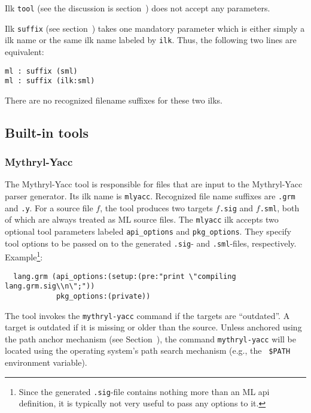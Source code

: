 Ilk {\tt tool} (see the discussion is section~)
does not accept any parameters.

Ilk {\tt suffix} (see section~) takes one
mandatory parameter which is either simply a ilk name or the same
ilk name labeled by {\tt ilk}.  Thus, the following two lines are
equivalent:

\begin{verbatim}
ml : suffix (sml)
ml : suffix (ilk:sml)
\end{verbatim}

There are no recognized filename suffixes for these two ilks.

\subsection{Built-in tools}
\label{sec:builtin-tools}

\subsubsection{Mythryl-Yacc}

The Mythryl-Yacc tool is responsible for files that are input to the
Mythryl-Yacc parser generator.  Its ilk name is {\tt mlyacc}.  Recognized
file name suffixes are {\tt .grm} and {\tt .y}.  For a source file
$f$, the tool produces two targets $f${\tt .sig} and $f${\tt .sml},
both of which are always treated as ML source files.  The {\tt mlyacc}
ilk accepts two optional tool parameters labeled {\tt api_options}
and {\tt pkg_options}.  They specify tool options to be passed on to
the generated {\tt .sig}- and {\tt .sml}-files, respectively.
Example\footnote{Since the generated {\tt .sig}-file contains nothing
more than an ML api definition, it is typically not very useful
to pass any options to it.}:

\begin{verbatim}
  lang.grm (api_options:(setup:(pre:"print \"compiling lang.grm.sig\\n\";"))
            pkg_options:(private))
\end{verbatim}

The tool invokes the {\tt mythryl-yacc} command if the targets are
``outdated''.  A target is outdated if it is missing or older than the
source.  Unless anchored using the path anchor mechanism (see
Section~), the command {\tt mythryl-yacc} will be located
using the operating system's path search mechanism (e.g., the {\tt
\$PATH} environment variable).

